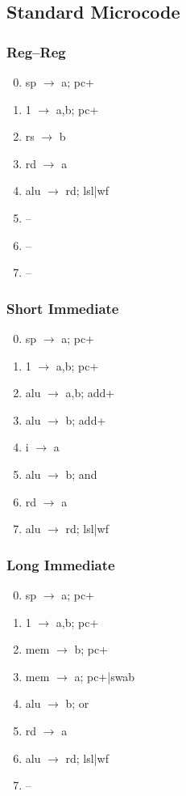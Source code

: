 \documentclass[11pt]{book}
\begin{document}
\subsection*{Standard Microcode}
\begin{multicols}{3}\ttfamily\selectfont\small
  \subsubsection*{Reg--Reg}
  \begin{enumerate}\setcounter{enumi}{-1}
  \item sp \(\rightarrow\) a; pc+
  \item 1 \(\rightarrow\) a,b; pc+
  \item rs \(\rightarrow\) b
  \item rd \(\rightarrow\) a
  \item alu \(\rightarrow\) rd; lsl|wf
  \item --
  \item --
  \item --
  \end{enumerate}
  \columnbreak
  \subsubsection*{Short Immediate}
  \begin{enumerate}\setcounter{enumi}{-1}
  \item sp \(\rightarrow\) a; pc+
  \item 1 \(\rightarrow\) a,b; pc+
  \item alu \(\rightarrow\) a,b; add+
  \item alu \(\rightarrow\) b; add+
  \item i \(\rightarrow\) a
  \item alu \(\rightarrow\) b; and
  \item rd \(\rightarrow\) a
  \item alu \(\rightarrow\) rd; lsl|wf
  \end{enumerate}
  \columnbreak
  \subsubsection*{Long Immediate}
  \begin{enumerate}\setcounter{enumi}{-1}
  \item sp \(\rightarrow\) a; pc+
  \item 1 \(\rightarrow\) a,b; pc+
  \item mem \(\rightarrow\) b; pc+
  \item mem \(\rightarrow\) a; pc+|swab
  \item alu \(\rightarrow\) b; or
  \item rd \(\rightarrow\) a
  \item alu \(\rightarrow\) rd; lsl|wf
  \item --
  \end{enumerate}
\end{multicols}
\end{document}
